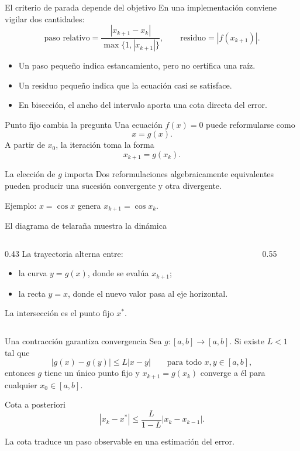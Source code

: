 \documentclass[aspectratio=169,12pt]{beamer}
\begin{document}
\begin{frame}{El criterio de parada depende del objetivo}
En una implementación conviene vigilar dos cantidades:
\[
\text{paso relativo}
=\frac{|x_{k+1}-x_k|}{\max\{1,|x_{k+1}|\}},
\qquad
\text{residuo}=|f(x_{k+1})|.
\]
\begin{itemize}
  \item Un paso pequeño indica estancamiento, pero no certifica una raíz.
  \item Un residuo pequeño indica que la ecuación casi se satisface.
  \item En bisección, el ancho del intervalo aporta una cota directa del error.
\end{itemize}
\end{frame}

\begin{frame}{Punto fijo cambia la pregunta}
Una ecuación $f(x)=0$ puede reformularse como
\[
x=g(x).
\]
A partir de $x_0$, la iteración toma la forma
\[
x_{k+1}=g(x_k).
\]
\begin{block}{La elección de $g$ importa}
Dos reformulaciones algebraicamente equivalentes pueden producir una sucesión
convergente y otra divergente.
\end{block}
Ejemplo: $x=\cos x$ genera $x_{k+1}=\cos x_k$.
\end{frame}

\begin{frame}{El diagrama de telaraña muestra la dinámica}
\begin{columns}[T,onlytextwidth]
\begin{column}{0.43\textwidth}
La trayectoria alterna entre:
\begin{itemize}
  \item la curva $y=g(x)$, donde se evalúa $x_{k+1}$;
  \item la recta $y=x$, donde el nuevo valor pasa al eje horizontal.
\end{itemize}
La intersección es el punto fijo $x^*$.
\end{column}
\begin{column}{0.55\textwidth}
\centering
\resizebox{0.86\linewidth}{!}{}
\end{column}
\end{columns}
\end{frame}

\begin{frame}{Una contracción garantiza convergencia}
Sea $g:[a,b]\to[a,b]$. Si existe $L<1$ tal que
\[
|g(x)-g(y)|\leq L|x-y|
\qquad\text{para todo }x,y\in[a,b],
\]
entonces $g$ tiene un único punto fijo y $x_{k+1}=g(x_k)$ converge a él para
cualquier $x_0\in[a,b]$.
\begin{block}{Cota a posteriori}
\[
|x_k-x^*|\leq\frac{L}{1-L}|x_k-x_{k-1}|.
\]
\end{block}
La cota traduce un paso observable en una estimación del error.
\end{frame}
\end{document}
